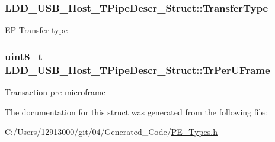 \subsubsection[{Transfer\+Type}]{ L\+D\+D\+\_\+\+U\+S\+B\+\_\+\+Host\+\_\+\+T\+Pipe\+Descr\+\_\+\+Struct\+::\+Transfer\+Type}\label{struct_l_d_d___u_s_b___host___t_pipe_descr___struct_a42bf0ec64bda6f7f31d32e3f4cd5df13}
E\+P Transfer type \hypertarget{struct_l_d_d___u_s_b___host___t_pipe_descr___struct_adb11454d0380a421cf7ab4fc225e5c41}{}
\subsubsection[{Tr\+Per\+U\+Frame}]{\setlength{\rightskip}{0pt plus 5cm}uint8\+\_\+t L\+D\+D\+\_\+\+U\+S\+B\+\_\+\+Host\+\_\+\+T\+Pipe\+Descr\+\_\+\+Struct\+::\+Tr\+Per\+U\+Frame}\label{struct_l_d_d___u_s_b___host___t_pipe_descr___struct_adb11454d0380a421cf7ab4fc225e5c41}
Transaction pre microframe 

The documentation for this struct was generated from the following file\+:\begin{DoxyCompactItemize}
\item 
C\+:/\+Users/12913000/git/04/\+Generated\+\_\+\+Code/\hyperlink{_p_e___types_8h}{P\+E\+\_\+\+Types.\+h}\end{DoxyCompactItemize}
